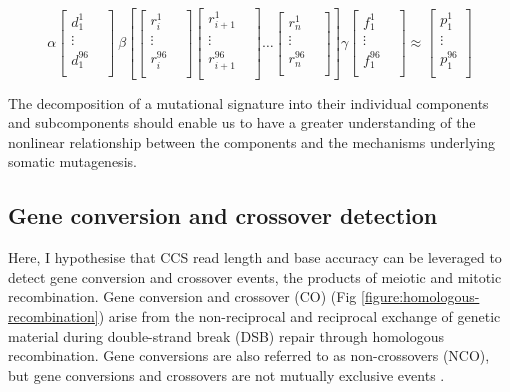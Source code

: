 \begin{equation} \label{eq:4}
\alpha \begin{bmatrix}
    d^{1}_{1}  \\
    \vdots &  \\
    d^{96}_{1}  \\
\end{bmatrix} \
\beta \left[\begin{bmatrix}
    r^{1}_{i} \\
    \vdots &  \\
    r^{96}_{i} \\
\end{bmatrix} 
\begin{bmatrix}
    r^{1}_{i+1} \\
    \vdots &  \\
    r^{96}_{i+1} \\
\end{bmatrix} \ldots 
\begin{bmatrix}
    r^{1}_{n} \\
    \vdots &  \\
    r^{96}_{n} \\
\end{bmatrix}\right]
\gamma \begin{bmatrix}
    f^{1}_{1}  \\
    \vdots &  \\
    f^{96}_{1}  \\
\end{bmatrix} \approx
\begin{bmatrix}
    p^{1}_{1} \\
    \vdots \\
    p^{96}_{1} \\
\end{bmatrix}
\end{equation}

The decomposition of a mutational signature into their individual components and subcomponents should enable us to have a greater understanding of the nonlinear relationship between the components and the mechanisms underlying somatic mutagenesis.

\subsection{Gene conversion and crossover detection}

Here, I hypothesise that CCS read length and base accuracy can be leveraged to detect gene conversion and crossover events, the products of meiotic and mitotic recombination. Gene conversion and crossover (CO) (Fig \ref{figure:homologous-recombination}) arise from the non-reciprocal and reciprocal exchange of genetic material during double-strand break (DSB) repair through homologous recombination. Gene conversions are also referred to as non-crossovers (NCO), but gene conversions and crossovers are not mutually exclusive events \cite{Hunter2015-gk}. 

